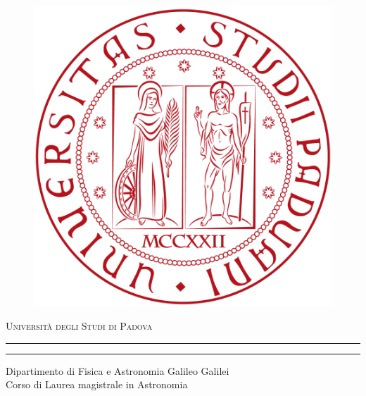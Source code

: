 \documentclass[corpo=12pt,numerazioneromana]{toptesi}
\begin{document}


\begin{titlepage}
\begin{figure}
\centering
\includegraphics[scale=0.1]{images/Logo_Padova.png}
\end{figure}
\begin{center}
{{\Large{\textsc{Università degli Studi di Padova}}}}
\rule[0.1cm]{15.8cm}{0.05mm}
\rule[0.5cm]{15.8cm}{0.3mm}
{{\Large 
Dipartimento di Fisica e Astronomia Galileo Galilei}}\\
\vspace{3mm}
{{ 
Corso di Laurea magistrale in Astronomia}}
\end{center}


\end{titlepage}
\end{document}
